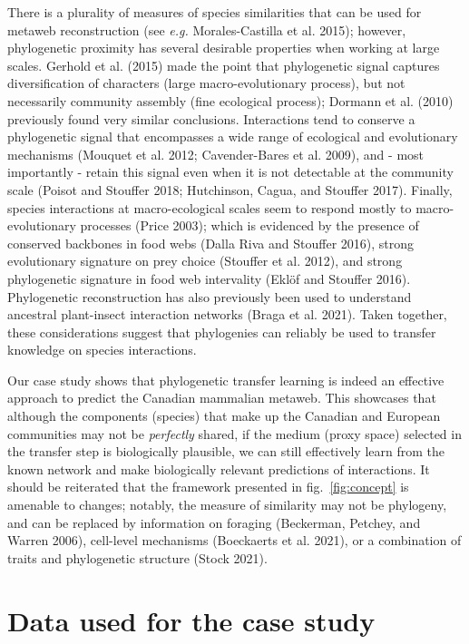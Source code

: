 \documentclass[11pt]{article}
\begin{document}
There is a plurality of measures of species similarities that can be
used for metaweb reconstruction (see \emph{e.g.} Morales-Castilla et al.
2015); however, phylogenetic proximity has several desirable properties
when working at large scales. Gerhold et al. (2015) made the point that
phylogenetic signal captures diversification of characters (large
macro-evolutionary process), but not necessarily community assembly
(fine ecological process); Dormann et al. (2010) previously found very
similar conclusions. Interactions tend to conserve a phylogenetic signal
that encompasses a wide range of ecological and evolutionary mechanisms
(Mouquet et al. 2012; Cavender-Bares et al. 2009), and - most
importantly - retain this signal even when it is not detectable at the
community scale (Poisot and Stouffer 2018; Hutchinson, Cagua, and
Stouffer 2017). Finally, species interactions at macro-ecological scales
seem to respond mostly to macro-evolutionary processes (Price 2003);
which is evidenced by the presence of conserved backbones in food webs
(Dalla Riva and Stouffer 2016), strong evolutionary signature on prey
choice (Stouffer et al. 2012), and strong phylogenetic signature in food
web intervality (Eklöf and Stouffer 2016). Phylogenetic reconstruction
has also previously been used to understand ancestral plant-insect
interaction networks (Braga et al. 2021). Taken together, these
considerations suggest that phylogenies can reliably be used to transfer
knowledge on species interactions.

Our case study shows that phylogenetic transfer learning is indeed an
effective approach to predict the Canadian mammalian metaweb. This
showcases that although the components (species) that make up the
Canadian and European communities may not be \emph{perfectly} shared, if
the medium (proxy space) selected in the transfer step is biologically
plausible, we can still effectively learn from the known network and
make biologically relevant predictions of interactions. It should be
reiterated that the framework presented in fig.~\ref{fig:concept} is
amenable to changes; notably, the measure of similarity may not be
phylogeny, and can be replaced by information on foraging (Beckerman,
Petchey, and Warren 2006), cell-level mechanisms (Boeckaerts et al.
2021), or a combination of traits and phylogenetic structure (Stock
2021).

\hypertarget{data-used-for-the-case-study}{%
\section{Data used for the case
study}\label{data-used-for-the-case-study}}
\end{document}
